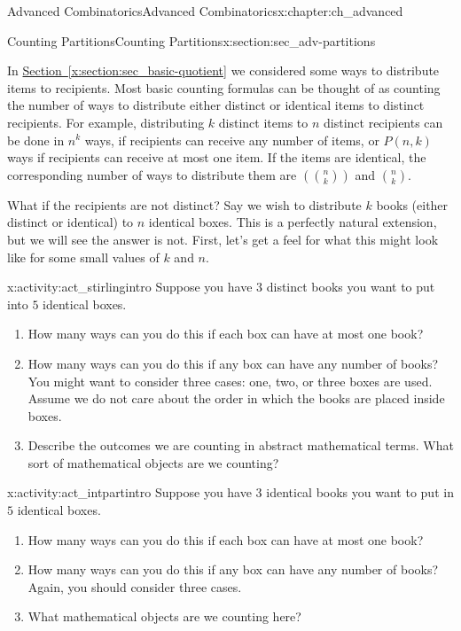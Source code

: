 \documentclass[oneside,10pt,]{book}
\numberwithin{equation}{chapter}
\newcommand{\mchoose}[2]{\left(\!\binom{#1}{#2}\!\right)}
\begin{document}
\begin{chapterptx}{Advanced Combinatorics}{}{Advanced Combinatorics}{}{}{x:chapter:ch_advanced}
\begin{sectionptx}{Counting Partitions}{}{Counting Partitions}{}{}{x:section:sec_adv-partitions}
\begin{introduction}{}
\par
In \hyperref[x:section:sec_basic-quotient]{Section~\ref{x:section:sec_basic-quotient}} we considered some ways to distribute items to recipients.  Most basic counting formulas can be thought of as counting the number of ways to distribute either distinct or identical items to distinct recipients.  For example, distributing \(k\) distinct items to \(n\) distinct recipients can be done in \(n^k\) ways, if recipients can receive any number of items, or \(P(n,k)\) ways if recipients can receive at most one item.  If the items are identical, the corresponding number of ways to distribute them are \(\mchoose{n}{k}\) and \(\binom{n}{k}\).%
\par
What if the recipients are not distinct?  Say we wish to distribute \(k\) books (either distinct or identical) to \(n\) identical boxes.  This is a perfectly natural extension, but we will see the answer is not.  First, let's get a feel for what this might look like for some small values of \(k\) and \(n\).%
\begin{activity}{}{x:activity:act_stirlingintro}%
Suppose you have \(3\) distinct books you want to put into \(5\) identical boxes.%
\begin{enumerate}[font=\bfseries,label=(\alph*),ref=\alph*]
\item{}How many ways can you do this if each box can have at most one book?%
\item{}How many ways can you do this if any box can have any number of books?  You might want to consider three cases: one, two, or three boxes are used.  Assume we do not care about the order in which the books are placed inside boxes.%
\item{}Describe the outcomes we are counting in abstract mathematical terms.  What sort of mathematical objects are we counting?%
\end{enumerate}
\end{activity}
\begin{activity}{}{x:activity:act_intpartintro}%
Suppose you have \(3\) identical books you want to put in \(5\) identical boxes.%
\begin{enumerate}[font=\bfseries,label=(\alph*),ref=\alph*]
\item{}How many ways can you do this if each box can have at most one book?%
\item{}How many ways can you do this if any box can have any number of books?  Again, you should consider three cases.%
\item{}What mathematical objects are we counting here?%

\end{enumerate}
\end{activity}
\end{introduction}
\end{sectionptx}
\end{chapterptx}
\end{document}
